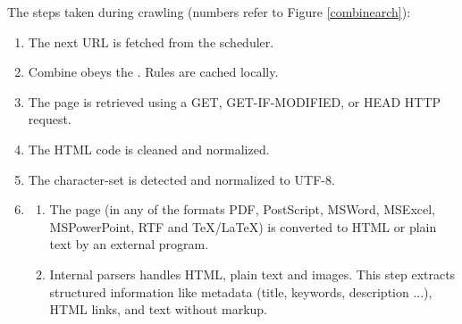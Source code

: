 The steps taken during crawling (numbers refer to Figure \ref{combinearch}):
\begin{enumerate}
\item The next URL is fetched from the scheduler.

\item Combine obeys the .
Rules are cached locally.

\item The page is retrieved using a GET, GET-IF-MODIFIED, or HEAD HTTP request.

\item The HTML code is cleaned and normalized.

\item The character-set is detected and normalized to UTF-8.

\item 

\begin{enumerate}
\item The page (in any of the formats PDF, PostScript, MSWord, MSExcel, MSPowerPoint, RTF and TeX/LaTeX) is converted to HTML or plain 
text by an external program.

\item Internal parsers handles HTML, plain text and images.
This step extracts structured information like metadata (title, keywords, description ...), HTML links,
  and text without markup.
\end{enumerate}


\end{enumerate}

